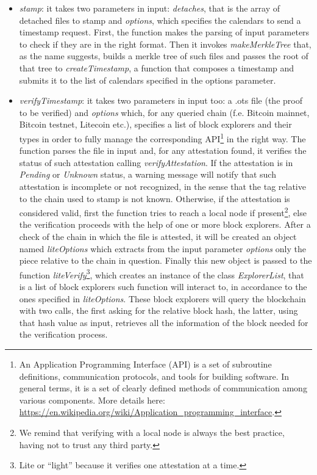 \begin{itemize}
    \item \textit{stamp}: it takes two parameters in input: \textit{detaches}, that is the array of detached files to stamp and \textit{options}, which specifies the calendars to send a timestamp request. First, the function makes the parsing of input parameters to check if they are in the right format. Then it invokes \textit{makeMerkleTree} that, as the name suggests, builds a merkle tree of such files and passes the root of that tree to \textit{createTimestamp}, a function that composes a timestamp and submits it to the list of calendars specified in the options parameter.
    \item \textit{verifyTimestamp}: it takes two parameters in input too: a \colorbox{light-gray}{.ots} file (the proof to be verified) and \textit{options} which, for any queried chain (f.e. Bitcoin mainnet, Bitcoin testnet, Litecoin etc.), specifies a list of block explorers and their types in order to fully manage the corresponding API\footnote{An Application Programming Interface (API) is a set of subroutine definitions, communication protocols, and tools for building software. In general terms, it is a set of clearly defined methods of communication among various components. More details here: \url{https://en.wikipedia.org/wiki/Application_programming_interface}.} in the right way. The function parses the file in input and, for any attestation found, it verifies the status of such attestation calling \textit{verifyAttestation}. If the attestation is in \textit{Pending} or \textit{Unknown} status, a warning message will notify that such attestation is incomplete or not recognized, in the sense that the tag relative to the chain used to stamp is not known. Otherwise, if the attestation is considered valid, first the function tries to reach a local node if present\footnote{We remind that verifying with a local node is always the best practice, having not to trust any third party.}, else the verification proceeds with the help of one or more block explorers. After a check of the chain in which the file is attested, it will be created an object named \textit{liteOptions} which extracts from the input parameter \textit{options} only the piece relative to the chain in question. Finally this new object is passed to the function \textit{liteVerify}\textup{\footnote{Lite or \enquote{light} because it verifies one attestation at a time.}}, which creates an instance of the class \textit{ExplorerList}, that is a list of block explorers such function will interact to, in accordance to the ones specified in \textit{liteOptions}. These block explorers will query the blockchain with two calls, the first asking for the relative block hash, the latter, using that hash value as input, retrieves all the information of the block needed for the verification process.

\end{itemize}
